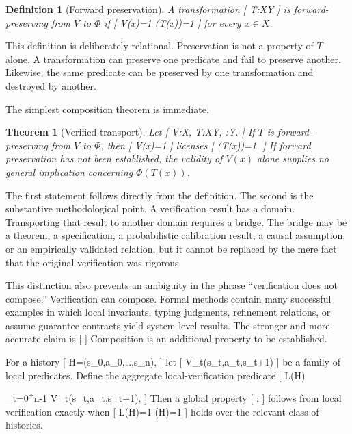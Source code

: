 \documentclass[11pt]{article}
\newtheorem{theorem}{Theorem} \newtheorem{proposition}{Proposition} \newtheorem{lemma}{Lemma} \newtheorem{corollary}{Corollary} \newtheorem{definition}{Definition} \newtheorem{remark}{Remark}
\newcommand{\Hist}{\mathcal{H}} \newcommand{\States}{\mathcal{S}} \newcommand{\Actions}{\mathcal{A}} \newcommand{\Obs}{\mathcal{O}} \newcommand{\Img}{\operatorname{Im}}
\begin{document}
\begin{definition}[Forward preservation]
A transformation
[
T:X\rightarrow Y
]
is \emph{forward-preserving from $V$ to $\Phi$} if
[
V(x)=1
\Longrightarrow
\Phi(T(x))=1
]
for every $x\in X$.
\end{definition}

This definition is deliberately relational. Preservation is not a property of $T$ alone. A transformation can preserve one predicate and fail to preserve another. Likewise, the same predicate can be preserved by one transformation and destroyed by another.

The simplest composition theorem is immediate.

\begin{theorem}[Verified transport]
Let
[
V:X,
\qquad
T:X\rightarrow Y,
\qquad
\Phi:Y.
]
If $T$ is forward-preserving from $V$ to $\Phi$, then
[
V(x)=1
]
licenses
[
\Phi(T(x))=1.
]
If forward preservation has not been established, the validity of $V(x)$ alone supplies no general implication concerning $\Phi(T(x))$.
\end{theorem}

The first statement follows directly from the definition. The second is the substantive methodological point. A verification result has a domain. Transporting that result to another domain requires a bridge. The bridge may be a theorem, a specification, a probabilistic calibration result, a causal assumption, or an empirically validated relation, but it cannot be replaced by the mere fact that the original verification was rigorous.

This distinction also prevents an ambiguity in the phrase ``verification does not compose.'' Verification can compose. Formal methods contain many successful examples in which local invariants, typing judgments, refinement relations, or assume-guarantee contracts yield system-level results. The stronger and more accurate claim is
[
]
Composition is an additional property to be established.

For a history
[
H=(s_0,a_0,\ldots,s_n),
]
let
[
V_t(s_t,a_t,s_{t+1})
]
be a family of local predicates. Define the aggregate local-verification predicate
[
L(H)

\bigwedge_{t=0}^{n-1}
V_t(s_t,a_t,s_{t+1}).
]
Then a global property
[
\Phi:\Hist{}
]
follows from local verification exactly when
[
L(H)=1
\Longrightarrow
\Phi(H)=1
]
holds over the relevant class of histories.
\end{document}

